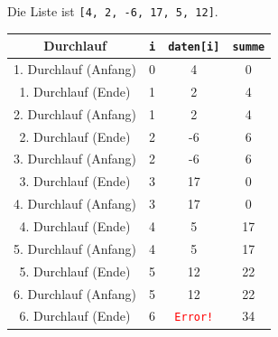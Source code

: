 \begin{myexercise}
	\begin{myanswer}
		Die Liste ist \lstinline|[4, 2, -6, 17, 5, 12]|.
		\begin{table}[H]
			\centering

			\begin{tabular}{c|c|c|c}
				\textbf{Durchlauf}    & \lstinline|i| & \lstinline|daten[i]|             & \lstinline|summe| \\\midrule\midrule
				1. Durchlauf (Anfang) & 0             & 4                                & 0                 \\\midrule
				1. Durchlauf (Ende)   & 1             & 2                                & 4                 \\\midrule\midrule
				2. Durchlauf (Anfang) & 1             & 2                                & 4                 \\\midrule
				2. Durchlauf (Ende)   & 2             & -6                               & 6                 \\\midrule\midrule
				3. Durchlauf (Anfang) & 2             & -6                               & 6                 \\\midrule
				3. Durchlauf (Ende)   & 3             & 17                               & 0                 \\\midrule\midrule
				4. Durchlauf (Anfang) & 3             & 17                               & 0                 \\\midrule
				4. Durchlauf (Ende)   & 4             & 5                                & 17                \\\midrule\midrule
				5. Durchlauf (Anfang) & 4             & 5                                & 17                \\\midrule
				5. Durchlauf (Ende)   & 5             & 12                               & 22                \\\midrule\midrule
				6. Durchlauf (Anfang) & 5             & 12                               & 22                \\\midrule
				6. Durchlauf (Ende)   & 6             & \textcolor{red}{\texttt{Error!}} & 34                \\
			\end{tabular}
		\end{table}
	\end{myanswer}
\end{myexercise}


